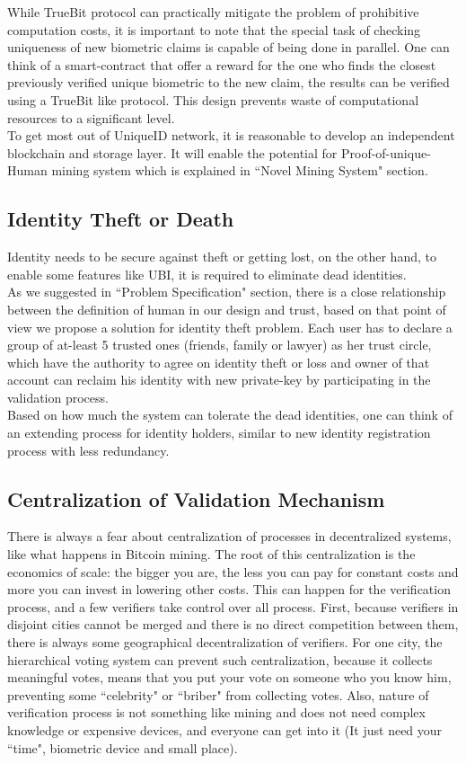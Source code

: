 \documentclass[conference]{IEEEtran}
\begin{document}
While TrueBit protocol can practically mitigate the problem of prohibitive computation costs, it is important to note that the special task of checking uniqueness of new biometric claims is capable of being done in parallel. One can think of a smart-contract that offer a reward for the one who finds the closest previously verified unique biometric to the new claim, the results can be verified using a TrueBit like protocol. This design prevents waste of computational resources to a significant level.\\
To get most out of UniqueID network, it is reasonable to develop an independent blockchain and storage layer. It will enable the potential for Proof-of-unique-Human mining system which is explained in ``Novel Mining System" section. 
\subsection{Identity Theft or Death}
Identity needs to be secure against theft or getting lost, on the other hand, to enable some features like UBI, it is required to eliminate dead identities.\\
As we suggested in ``Problem Specification" section, there is a close relationship between the definition of human in our design and trust, based on that point of view we propose a solution for identity theft problem. Each user has to declare a group of at-least 5 trusted ones (friends, family or lawyer) as her trust circle, which have the authority to agree on identity theft or loss and owner of that account can reclaim his identity with new private-key by participating in the validation process.\\
Based on how much the system can tolerate the dead identities, one can think of an extending process for identity holders, similar to new identity registration process with less redundancy.
\subsection{Centralization of Validation Mechanism}
There is always a fear about centralization of processes in decentralized systems, like what happens in Bitcoin mining. The root of this centralization is the economics of scale: the bigger you are, the less you can pay for constant costs and more you can invest in lowering other costs. This can happen for the verification process, and a few verifiers take control over all process. First, because verifiers in disjoint cities cannot be merged and there is no direct competition between them, there is always some geographical decentralization of verifiers. For one city, the hierarchical voting system can prevent such centralization, because it collects meaningful votes, means that you put your vote on someone who you know him, preventing some ``celebrity" or ``briber" from collecting votes. Also, nature of verification process is not something like mining and does not need complex knowledge or expensive devices, and everyone can get into it (It just need your ``time", biometric device and small place). 
\end{document}
